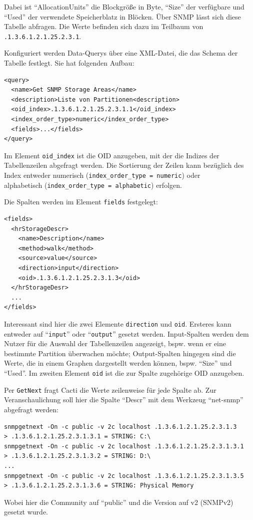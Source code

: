 \documentclass[12pt,ngerman,toc=listofnumbered,toc=bibliographynumbered,toc=index,headsepline=true]{scrbook}
\begin{document}
Dabei ist \enquote{AllocationUnits} die Blockgröße in Byte, \enquote{Size} der
verfügbare und \enquote{Used} der verwendete Speicherblatz in Blöcken. Über
SNMP lässt sich diese Tabelle abfragen. Die Werte befinden sich dazu im Teilbaum
von \\ \texttt{.1.3.6.1.2.1.25.2.3.1}.

Konfiguriert werden Data-Querys über eine XML-Datei, die das Schema der Tabelle
festlegt. Sie hat folgenden Aufbau:
\begin{lstlisting}[xleftmargin=20pt]
<query>
  <name>Get SNMP Storage Areas</name>
  <description>Liste von Partitionen<description>
  <oid_index>.1.3.6.1.2.1.25.2.3.1.1</oid_index>
  <index_order_type>numeric</index_order_type>
  <fields>...</fields>
</query>
\end{lstlisting}
Im Element \texttt{oid\_index} ist die OID anzugeben, mit der die Indizes der
Tabellenzeilen abgefragt werden. Die Sortierung der Zeilen kann bezüglich des
Index entweder numerisch  (\texttt{index\_order\_type = numeric}) oder \\
alphabetisch (\texttt{index\_order\_type = alphabetic}) erfolgen.

Die Spalten werden im Element \texttt{fields} festgelegt:
\begin{lstlisting}[xleftmargin=20pt]
<fields>
  <hrStorageDescr>
    <name>Description</name>
    <method>walk</method>
    <source>value</source>
    <direction>input</direction>
    <oid>.1.3.6.1.2.1.25.2.3.1.3</oid>
  </hrStorageDesr>
  ...
</fields>
\end{lstlisting}
Interessant sind hier die zwei Elemente \texttt{direction} und \texttt{oid}.
Ersteres kann entweder auf \enquote{\texttt{input}} oder
\enquote{\texttt{output}} gesetzt werden. Input-Spalten werden dem Nutzer für
die Auswahl der Tabellenzeilen angezeigt, bspw. wenn er eine bestimmte Partition
überwachen möchte; Output-Spalten hingegen sind die Werte, die in einem Graphen
dargestellt werden können, bspw. \enquote{Size} und \enquote{Used}. Im zweiten
Element \texttt{oid} ist die zur Spalte zugehörige OID anzugeben. 

Per \texttt{GetNext} fragt Cacti die Werte zeilenweise für jede Spalte ab. Zur
Veranschaulichung soll hier die Spalte \enquote{Descr} mit dem Werkzeug
\enquote{net-snmp} abgefragt werden:
\begin{lstlisting}[xleftmargin=20pt]
snmpgetnext -On -c public -v 2c localhost .1.3.6.1.2.1.25.2.3.1.3
> .1.3.6.1.2.1.25.2.3.1.3.1 = STRING: C:\
snmpgetnext -On -c public -v 2c localhost .1.3.6.1.2.1.25.2.3.1.3.1
> .1.3.6.1.2.1.25.2.3.1.3.2 = STRING: D:\
...
snmpgetnext -On -c public -v 2c localhost .1.3.6.1.2.1.25.2.3.1.3.5
> .1.3.6.1.2.1.25.2.3.1.3.6 = STRING: Physical Memory
\end{lstlisting}
Wobei hier die Community auf \enquote{public} und die Version auf v2 (SNMPv2)
gesetzt wurde.
\end{document}
